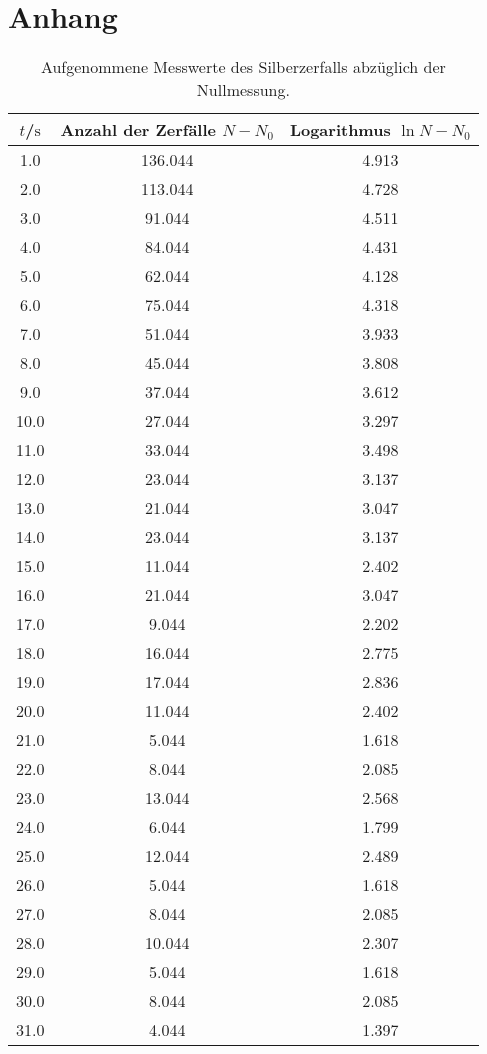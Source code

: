 \section{Anhang}




  \begin{longtable}{ccc}
  \caption{Aufgenommene Messwerte des Silberzerfalls abzüglich der Nullmessung.}\label{tab:anhang}\\
  \hline
$t$/$\si{\second}$ & Anzahl der Zerfälle $N-N_0$ & Logarithmus $\ln{N-N_0}$ \\
\hline
1.0 & 136.044 & 4.913 \\
2.0 & 113.044 & 4.728 \\
3.0 & 91.044 & 4.511 \\
4.0 & 84.044 & 4.431 \\
5.0 & 62.044 & 4.128 \\
6.0 & 75.044 & 4.318 \\
7.0 & 51.044 & 3.933 \\
8.0 & 45.044 & 3.808 \\
9.0 & 37.044 & 3.612 \\
10.0 & 27.044 & 3.297 \\
11.0 & 33.044 & 3.498 \\
12.0 & 23.044 & 3.137 \\
13.0 & 21.044 & 3.047 \\
14.0 & 23.044 & 3.137 \\
15.0 & 11.044 & 2.402 \\
16.0 & 21.044 & 3.047 \\
17.0 & 9.044 & 2.202 \\
18.0 & 16.044 & 2.775 \\
19.0 & 17.044 & 2.836 \\
20.0 & 11.044 & 2.402 \\
21.0 & 5.044 & 1.618 \\
22.0 & 8.044 & 2.085 \\
23.0 & 13.044 & 2.568 \\
24.0 & 6.044 & 1.799 \\
25.0 & 12.044 & 2.489 \\
26.0 & 5.044 & 1.618 \\
27.0 & 8.044 & 2.085 \\
28.0 & 10.044 & 2.307 \\
29.0 & 5.044 & 1.618 \\
30.0 & 8.044 & 2.085 \\
31.0 & 4.044 & 1.397 \\

\end{longtable}
